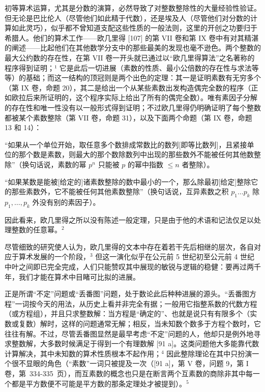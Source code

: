 初等算术运算，尤其是分数的演算，必然导致了对整数整除性的大量经验性验证。但无论是巴比伦人（尽管他们如此精于代数），还是埃及人（尽管他们对分数的计算如此灵巧），似乎都不曾知道支配这些性质的一般法则，这里的开创之功要归于希腊人。他们的算术工作——欧几里得 {[}107{]} 的第 VII 卷和第 IX 卷中有对其精湛的阐述——比起他们在其他数学分支中的那些最美的发现也毫不逊色。两个整数的最大公约数的存在性，在第 VII 卷一开头就已通过以“欧几里得算法”之名著称的程序得到证明；¹ 它是此后一切进展（素数的性质、最小公倍数的存在性与求法等等）的基础；而这一结构的顶冠则是两个出色的定理：其一是证明素数有无穷多个（第 IX 卷，命题 20），其二是给出一个从某些素数出发构造偶完全数的程序（正如欧拉后来所证明的，这个程序实际上给出了所有的偶完全数）。唯有素因子分解的存在性和唯一性没有以一般形式得到证明；不过欧几里得仍明确证明了每个整数都被某个素数整除（第 VII 卷，命题 31），以及下面两个命题（第 IX 卷，命题 13 和 14）：

“如果从一个单位开始，取任意多个数排成常数比的数列{[}即等比数列{]}，且紧接单位的那个数是素数，则最大的那个数除数列中出现的那些数外不能被任何其他数整除”（换句话说，素数的幂 \(p^n\) 只能被 \(p\) 的幂中指数 \(\leq n\) 者整除）。

“如果某数是能被{[}给定的{]}诸素数整除的数中最小的一个，那么除最初{[}给定{]}整除它的那些素数外，它不能被任何其他素数整除”（换句话说，互异素数之积 \(p_1 \ldots p_k\) 除 \(p_1, \ldots, p_k\) 外没有别的素因子）。

因此看来，欧几里得之所以没有陈述一般定理，只是由于他的术语和记法仅足以处理整数的任意幂。\(^{2}\)

尽管细致的研究使人认为，欧几里得的文本中存在着若干先后相继的层次，各自对应于算术发展的一个阶段，\(^{3}\) 但这一演化似乎在公元前 5 世纪初至公元前 4 世纪中叶之间即已完全完成，人们只能赞叹其中展现的敏锐与逻辑的稳健：要再过两千年，我们才能在算术中目睹可比拟的进展。

正是所谓“不定”问题或“丢番图”问题，处于数论此后种种进展的源头。“丢番图方程”一词按今天的用法，从历史上看并非完全有据；一般用它指整系数的代数方程（或方程组），并且只求整数解：当方程是“确定的”、也就是说只有有限多个（实数或复数）解时，这样的问题通常无解；相反，当未知数个数多于方程个数时，它往往有解。不过，尽管丢番图显然是最早考虑“不定”问题的人，他却只是例外地寻求整数解，大多数时候满足于得到一个有理数解 {[}91 a{]}。这类问题他大多能靠代数计算解决，其中未知数的算术性质根本不起作用；\(^{4}\) 因此整除理论在其中只扮演一个很不显眼的角色（“素数”一词只被提及一次（{[}91 a{]}，第 V 卷，问题 9，第 I 卷，第~334-335~页），而互素数的概念也只是在断言两个互素数的商除非其中每一个都是平方数便不可能是平方数的那条定理处才被提到）。\(^{5}\)

